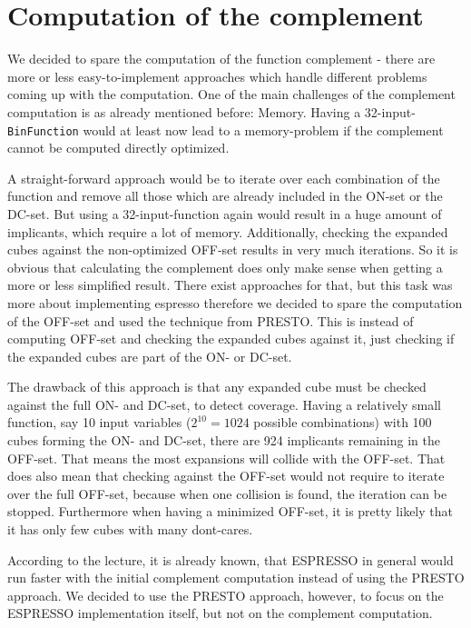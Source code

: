 \documentclass[colorback,accentcolor=tud1c,11pt]{tudreport}
\newcommand\code[1]{\texttt{#1}}
\begin{document}
  \section{Computation of the complement}
  We decided to spare the computation of the function complement - there are more or less easy-to-implement approaches which handle different problems coming up with the computation. One of the main challenges of the complement computation is as already mentioned before: Memory. Having a 32-input-\code{BinFunction} would at least now lead to a memory-problem if the complement cannot be computed directly optimized.
  \par
  A straight-forward approach would be to iterate over each combination of the function and remove all those which are already included in the ON-set or the DC-set. But using a 32-input-function again would result in a huge amount of implicants, which require a lot of memory. Additionally, checking the expanded cubes against the non-optimized OFF-set results in very much iterations. So it is obvious that calculating the complement does only make sense when getting a more or less simplified result. There exist approaches for that, but this task was more about implementing espresso therefore we decided to spare the computation of the OFF-set and used the technique from PRESTO. This is instead of computing OFF-set and checking the expanded cubes against it, just checking if the expanded cubes are part of the ON- or DC-set.
  \par
  The drawback of this approach is that any expanded cube must be checked against the full ON- and DC-set, to detect coverage. Having a relatively small function, say 10 input variables ($2^{10}=1024$ possible combinations) with 100 cubes forming the ON- and DC-set, there are 924 implicants remaining in the OFF-set. That means the most expansions will collide with the OFF-set. That does also mean that checking against the OFF-set would not require to iterate over the full OFF-set, because when one collision is found, the iteration can be stopped. Furthermore when having a minimized OFF-set, it is pretty likely that it has only few cubes with many dont-cares.
  \par
  According to the lecture, it is already known, that ESPRESSO in general would run faster with the initial complement computation instead of using the PRESTO approach. We decided to use the PRESTO approach, however, to focus on the ESPRESSO implementation itself, but not on the complement computation.
\end{document}
